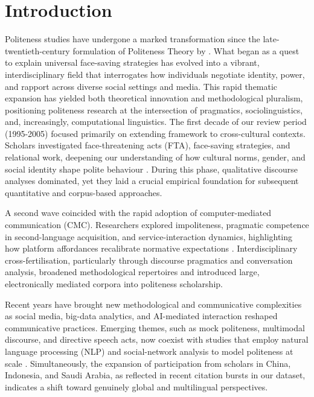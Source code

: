 \documentclass[english]{textolivre}
\begin{document}
\section{Introduction}\label{sec-intro}
Politeness studies have undergone a marked transformation since the late-twentieth-century formulation of Politeness Theory by \textcite{brown1987}. What began as a quest to explain universal face-saving strategies has evolved into a vibrant, interdisciplinary field that interrogates how individuals negotiate identity, power, and rapport across diverse social settings and media. This rapid thematic expansion has yielded both theoretical innovation and methodological pluralism, positioning politeness research at the intersection of pragmatics, sociolinguistics, and, increasingly, computational linguistics. The first decade of our review period (1995-2005) focused primarily on extending  framework to cross-cultural contexts. Scholars investigated face-threatening acts (FTA), face-saving strategies, and relational work, deepening our understanding of how cultural norms, gender, and social identity shape polite behaviour \cite{eelen2001, mills2003, watts2003}. During this phase, qualitative discourse analyses dominated, yet they laid a crucial empirical foundation for subsequent quantitative and corpus-based approaches.

A second wave coincided with the rapid adoption of computer-mediated communication (CMC). Researchers explored impoliteness, pragmatic competence in second-language acquisition, and service-interaction dynamics, highlighting how platform affordances recalibrate normative expectations \cite{bousfield-culpeper2008, culpeper2005, locher2005a}. Interdisciplinary cross-fertilisation, particularly through discourse pragmatics and conversation analysis, broadened methodological repertoires and introduced large, electronically mediated corpora into politeness scholarship.

Recent years have brought new methodological and communicative complexities as social media, big-data analytics, and AI-mediated interaction reshaped communicative practices. Emerging themes, such as mock politeness, multimodal discourse, and directive speech acts, now coexist with studies that employ natural language processing (NLP) and social-network analysis to model politeness at scale \cite{culpeper2017, kadar2017a}. Simultaneously, the expansion of participation from scholars in China, Indonesia, and Saudi Arabia, as reflected in recent citation bursts in our dataset, indicates a shift toward genuinely global and multilingual perspectives.
\end{document}
